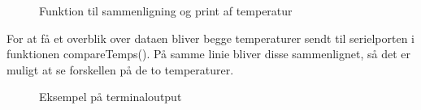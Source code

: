 \begin{figure}[h!]
  \centering
  \caption{Funktion til sammenligning og print af temperatur}
  \label{compareTemp}
\end{figure}
\newpage
For at få et overblik over dataen bliver begge temperaturer sendt til serielporten i funktionen compareTemps(). På samme linie bliver disse sammenlignet, så det er muligt at se forskellen på de to temperaturer.

\begin{figure}[h!]
  \centering
  \caption{Eksempel på terminaloutput}
  \label{term_output}
\end{figure}
